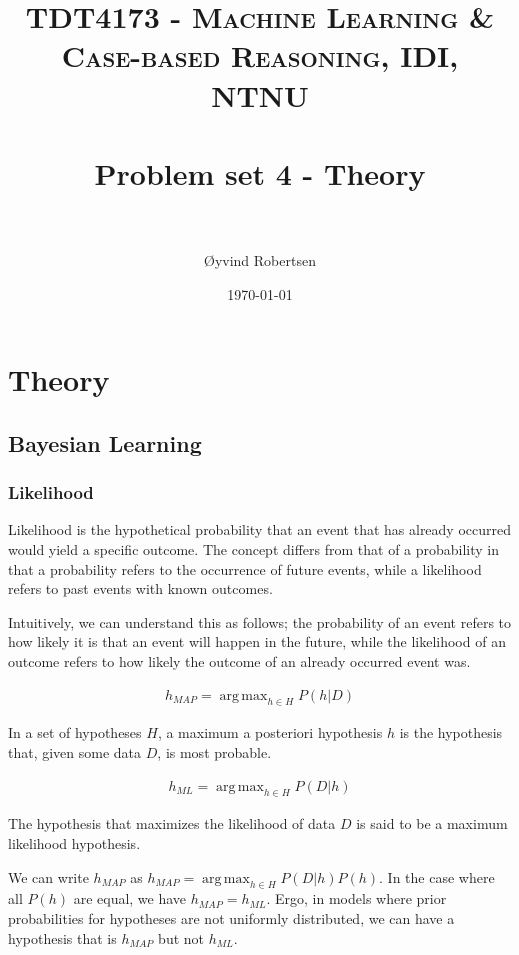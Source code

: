 \documentclass[paper=a4, fontsize=11pt]{scrartcl} %
\title{	
    \normalfont \normalsize 
    \textsc{TDT4173 - Machine Learning \& Case-based Reasoning, IDI, NTNU} \\ [25pt] %
    \horrule{0.5pt} \\[0.4cm] %
    \huge Problem set 4 - Theory \\ %
    \horrule{2pt} \\[0.5cm] %
}
\author{Øyvind Robertsen} %
\date{\normalsize\today} %
\numberwithin{equation}{section} %
\numberwithin{figure}{section} %
\numberwithin{table}{section} %
\DeclareMathOperator*{\argmax}{arg\,max}
\begin{document}
\maketitle %


\section{Theory}

\subsection{Bayesian Learning}

\subsubsection{Likelihood}

Likelihood is the hypothetical probability that an event that has already occurred would yield a specific outcome.
The concept differs from that of a probability in that a probability refers to the occurrence of future events, while a likelihood refers to past events with known outcomes. \cite{bib:wolfram-likelihood}

Intuitively, we can understand this as follows; the probability of an event refers to how likely it is that an event will happen in the future, while the likelihood of an outcome refers to how likely the outcome of an already occurred event was.

\begin{gather*}
    h_{MAP} = \argmax_{h \in H} P(h|D)
\end{gather*}

In a set of hypotheses $H$, a maximum a posteriori hypothesis $h$ is the hypothesis that, given some data $D$, is most probable.

\begin{gather*}
    h_{ML} = \argmax_{h \in H} P(D|h)
\end{gather*}

The hypothesis that maximizes the likelihood of data $D$ is said to be a maximum likelihood hypothesis.

We can write $h_{MAP}$ as $h_{MAP} = \argmax_{h \in H} P(D|h)P(h)$.
In the case where all $P(h)$ are equal, we have $h_{MAP} = h_{ML}$.
Ergo, in models where prior probabilities for hypotheses are not uniformly distributed, we can have a hypothesis that is $h_{MAP}$ but not $h_{ML}$.
\end{document}
